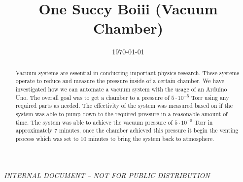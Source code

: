 \documentclass[aps,prl,twocolumn,showpacs,superscriptaddress,groupedaddress]{revtex4}  %
\begin{document}
\widetext
{}
\bigskip
\centerline{\em INTERNAL DOCUMENT -- NOT FOR PUBLIC DISTRIBUTION}


\title{One Succy Boiii (Vacuum Chamber)}     %
\date{\today}


\begin{abstract}
Vacuum systems are essential in conducting important physics research. These systems operate to reduce and measure the pressure inside of a certain chamber. We have investigated how we can automate a vacuum system with the usage of an Arduino Uno. The overall goal was to get a chamber to a pressure of $5 \cdot 10^{-5}$ Torr using any required parts as needed. The effectivity of the system was measured based on if the system was able to pump down to the required pressure in a reasonable amount of time. The system was able to achieve the vacuum pressure of  $5 \cdot 10^{-5}$ Torr in approximately $7$ minutes, once the chamber achieved this pressure it begin the venting process which was set to $10$ minutes to bring the system back to atmosphere. 
\end{abstract}

\maketitle

\end{document}
